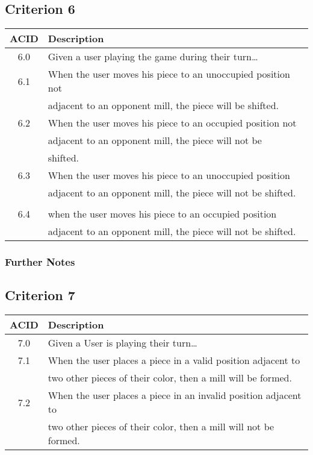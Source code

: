 \documentclass[11pt]{article}
\begin{document}
\subsection{Criterion 6}
\label{sec:org3c5cf33}
\begin{center}
\begin{tabular}{|c|l|}
ACID & Description\\
\hline
6.0 & Given a user playing the game during their turn\ldots{}\\
\hline
6.1 & When the user moves his piece to an unoccupied position not\\
 & adjacent to an opponent mill, the piece will be shifted.\\
6.2 & When the user moves his piece to an occupied position not\\
 & adjacent to an opponent mill, the piece will not be\\
 & shifted.\\
6.3 & When the user moves his piece to an unoccupied position\\
 & adjacent to an opponent mill, the piece will not be shifted.\\
 & \\
6.4 & when the user moves his piece to an occupied position\\
 & adjacent to an opponent mill, the piece will not be shifted.\\
\end{tabular}
\end{center}

\subsubsection*{Further Notes}
\label{sec:org81fad58}

\subsection{Criterion 7}
\label{sec:org8907051}
\begin{center}
\begin{tabular}{|c|l|}
ACID & Description\\
\hline
7.0 & Given a User is playing their turn\ldots{}\\
\hline
7.1 & When the user places a piece in a valid position adjacent to\\
 & two other pieces of their color, then a mill will be formed.\\
7.2 & When the user places a piece in an invalid position adjacent to\\
 & two other pieces of their color, then a mill will not be formed.\\
\end{tabular}
\end{center}
\end{document}
